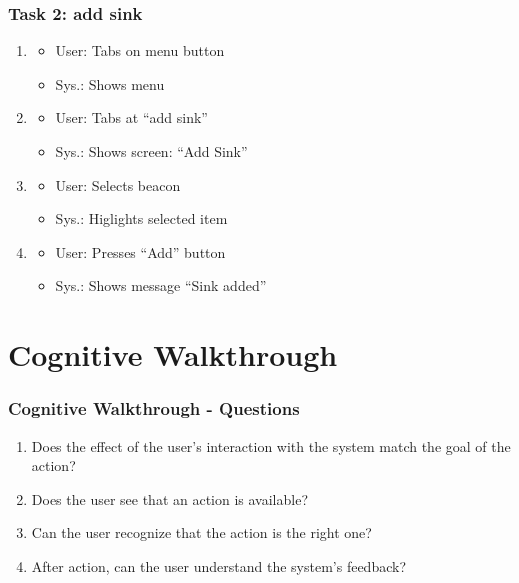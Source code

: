 \documentclass{beamer}
\begin{document}
\begin{frame}
  \frametitle{Task 2: add sink}
  \begin{enumerate}
  \item	\begin{itemize}
    \item User: Tabs on menu button
    \item Sys.: Shows menu
    \end{itemize}
    
  \item	\begin{itemize}         
    \item User: Tabs at ``add sink''
    \item Sys.: Shows screen: ``Add Sink''
    \end{itemize}

    
  \item	\begin{itemize}
    \item User: Selects beacon
    \item Sys.: Higlights selected item
    \end{itemize}
    
  \item	\begin{itemize}         
    \item User: Presses ``Add'' button
    \item Sys.: Shows message ``Sink added''
    \end{itemize}          
  \end{enumerate}
\end{frame}


\section{Cognitive Walkthrough}
\begin{frame}
  \frametitle{Cognitive Walkthrough - Questions}
  \begin{enumerate}
  \item Does the effect of the user's interaction with the system match the goal of the action?
  \item Does the user see that an action is available?
  \item Can the user recognize that the action is the right one?
  \item After action, can the user understand the system's feedback?
  \end{enumerate}
\end{frame}
\end{document}
